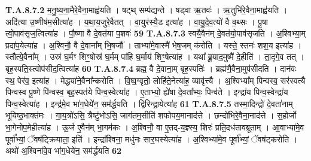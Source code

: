 \documentclass[17pt]{extarticle}
\begin{document}
                  \newline
                                                                  \textbf{ T.A.8.7.2} \newline
                  म॒नु॒ष्य॒ना॒मैरे॒वैना॒माह्व॑यति ।  षट्थ् सम्प॑द्यन्ते । षड्वा ऋ॒तवः॑ ।  ऋ॒तुभि॑रे॒वैना॒माह्व॑यति । अदि॑त्या उ॒ष्णीष॑म॒सीत्या॑ह । य॒था॒य॒जुरे॒वैतत् ।  वा॒युर॑स्यै॒ड इत्या॑ह । वा॒यु॒दे॒व॒त्यो॑ वै व॒थ्सः ।  पू॒षा त्वो॒पाव॑सृज॒त्वित्या॑ह । पौ॒ष्णा वै दे॒वत॑या प॒शवः॑ \textbf{ 59} \newline
                  \newline
                                                                  \textbf{ T.A.8.7.3} \newline
                  स्वयै॒वैन॑म् दे॒वत॑यो॒पाव॑सृजति । अ॒श्विभ्या॒म् प्रदा॑प॒येत्या॑ह । अ॒श्विनौ॒ वै दे॒वाना᳚म् भि॒षजौ᳚ । ताभ्या॑मे॒वास्मै॑ भेष॒जम् क॑रोति । यस्ते॒ स्तनः॑ शश॒य इत्या॑ह । स्तौत्ये॒वैना᳚म् । उस्र॑ घ॒र्मꣳ शिꣳ॒॒षोस्र॑ घ॒र्मम् पा॑हि घ॒र्माय॑ शिꣳ॒॒षेत्या॑ह । यथा᳚ ब्रू॒याद॒मुष्मै॑ दे॒हीति॑ । ता॒दृगे॒व तत् । बृह॒स्पति॒स्त्वोप॑सीद॒त्वित्या॑ह \textbf{ 60} \newline
                  \newline
                                                                  \textbf{ T.A.8.7.4} \newline
                  ब्रह्म॒ वै दे॒वाना॒म् बृह॒स्पतिः॑ । ब्रह्म॑णै॒वैना॒मुप॑सीदति ।  दान॑वः स्थ॒ पेर॑व॒ इत्या॑ह । मेद्ध्या॑ने॒वैना᳚न्करोति ।  वि॒ष्व॒ग्वृतो॒ लोहि॑ते॒नेत्या॑ह॒ व्यावृ॑त्त्यै ।  अ॒श्विभ्या᳚म् पिन्वस्व॒ सर॑स्वत्यै पिन्वस्व पू॒ष्णे पि॑न्वस्व॒ बृह॒स्पत॑ये पिन्व॒स्वेत्या॑ह ।  ए॒ताभ्यो॒ ह्ये॑षा दे॒वता᳚भ्यः॒ पिन्व॑ते ।  इन्द्रा॑य पिन्व॒स्वेन्द्रा॑य पिन्व॒स्वेत्या॑ह ।  इन्द्र॑मे॒व भा॑ग॒धेये॑न॒ सम॑र्द्धयति । द्विरिन्द्रा॒येत्या॑ह \textbf{ 61} \newline
                  \newline
                                                                  \textbf{ T.A.8.7.5} \newline
                  तस्मा॒दिन्द्रो॑ दे॒वता॑नाम् भूयिष्ठ॒भाक्त॑मः ।  गा॒य॒त्रो॑ऽसि॒ त्रैष्टु॑भोऽसि॒ जाग॑तम॒सीति॑ शफोपय॒मानाद॑त्ते ।  छन्दो॑भिरे॒वैना॒नाद॑त्ते । स॒होर्जो भा॒गेनोप॒मेहीत्या॑ह ।  ऊ॒र्ज ए॒वैन॑म् भा॒गम॑कः ।  अ॒श्विनौ॒ वा ए॒तद्-य॒ज्ञ्स्य॒ शिरः॑ प्रति॒दध॑तावब्रूताम् ।  आ॒वाभ्या॑मे॒व पूर्वा᳚भ्यां॒ ॅवष॑ट्क्रियाता॒ इति॑ ।  इन्द्रा᳚श्विना॒ मधु॑नः सार॒घस्येत्या॑ह ।  अ॒श्विभ्या॑मे॒व पूर्वा᳚भ्यां॒ ॅवष॑ट्करोति ।  अथो॑ अ॒श्विना॑वे॒व भा॑ग॒धेये॑न॒ सम॑र्द्धयति \textbf{ 62} \newline
                  \newline
\end{document}
